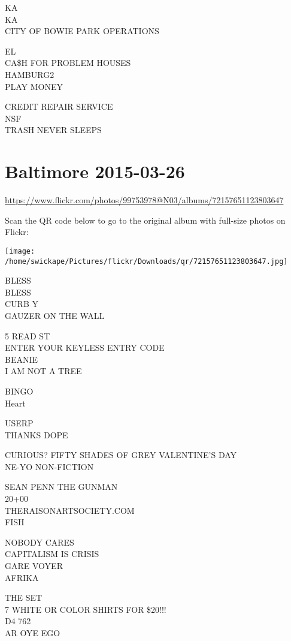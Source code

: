 \documentclass[10pt,letterpaper]{article}
\begin{document}
KA\\
KA\\
CITY OF BOWIE PARK OPERATIONS

EL\\
CA\$H FOR PROBLEM HOUSES\\
HAMBURG2\\
PLAY MONEY

CREDIT REPAIR SERVICE\\
NSF\\
TRASH NEVER SLEEPS
\pagebreak

\section*{Baltimore 2015-03-26}

\url{https://www.flickr.com/photos/99753978@N03/albums/72157651123803647}

Scan the QR code below to go to the original album with full-size photos on Flickr:

\texttt{[image: /home/swickape/Pictures/flickr/Downloads/qr/72157651123803647.jpg]}
\pagebreak

BLESS\\
BLESS\\
CURB Y\\
GAUZER ON THE WALL

5 READ ST\\
ENTER YOUR KEYLESS ENTRY CODE\\
BEANIE\\
I AM NOT A TREE

BINGO\\
Heart

USERP\\
THANKS DOPE

CURIOUS?  FIFTY SHADES OF GREY VALENTINE'S DAY\\
NE{-}YO NON{-}FICTION

SEAN PENN THE GUNMAN\\
20+00\\
THERAISONARTSOCIETY.COM\\
FISH

NOBODY CARES\\
CAPITALISM IS CRISIS\\
GARE VOYER\\
AFRIKA

THE SET\\
7 WHITE OR COLOR SHIRTS FOR \$20!!!\\
D4 762\\
AR OYE EGO
\end{document}
